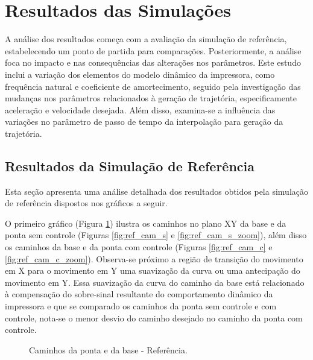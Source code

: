 \section{Resultados das Simulações}
A análise dos resultados começa com a avaliação da simulação de referência, estabelecendo um ponto de partida para comparações. Posteriormente, a análise foca no impacto e nas consequências das alterações nos parâmetros. Este estudo inclui a variação dos elementos do modelo dinâmico da impressora, como frequência natural e coeficiente de amortecimento, seguido pela investigação das mudanças nos parâmetros relacionados à geração de trajetória, especificamente aceleração e velocidade desejada. Além disso, examina-se a influência das variações no parâmetro de passo de tempo da interpolação para geração da trajetória.

\subsection{Resultados da Simulação de Referência}
Esta seção apresenta uma análise detalhada dos resultados obtidos pela simulação de referência dispostos nos gráficos a seguir.

O primeiro gráfico (Figura \ref{fig:ref_cam}) ilustra os caminhos no plano XY da base e da ponta sem controle (Figuras \ref{fig:ref_cam_s} e \ref{fig:ref_cam_s_zoom}), além disso os caminhos da base e da ponta com controle (Figuras \ref{fig:ref_cam_c} e \ref{fig:ref_cam_c_zoom}). Observa-se próximo a região de transição do movimento em X para o movimento em Y uma suavização da curva ou uma antecipação do movimento em Y.
Essa suavização da curva do caminho da base está relacionado à compensação do sobre-sinal resultante do comportamento dinâmico da impressora e que se comparado os caminhos da ponta sem controle e com controle, nota-se o menor desvio do caminho desejado no caminho da ponta com controle.

\begin{figure}[H]
    \centering
    \hfill
    \hfill
    \hfill
    \caption{Caminhos da ponta e da base - Referência.}
    \label{fig:ref_cam}
\end{figure}

